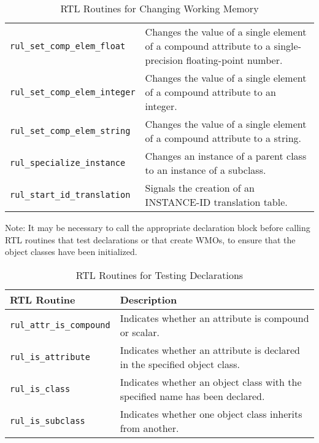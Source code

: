 \begin{table}[h]
\begin{tabularx}{\columnwidth}{lX}
    \verb|rul_set_comp_elem_float|   & Changes the value of a single element of a    
                                       compound attribute to a single-precision      
                                       floating-point number.                        \\
    \verb|rul_set_comp_elem_integer| & Changes the value of a single element of a    
                                       compound attribute to an integer.             \\
    \verb|rul_set_comp_elem_string|  & Changes the value of a single element of a    
                                       compound attribute to a string.               \\
    \verb|rul_specialize_instance|   & Changes an instance of a parent class to an   
                                       instance of a subclass.                       \\
    \verb|rul_start_id_translation|  & Signals the creation of an INSTANCE-ID        
                                       translation table.                            \\
    \bottomrule
  \end{tabularx}
  \caption{RTL Routines for Changing Working Memory}
  \label{t:6-6}
\end{table}

Note: It may be necessary to call the appropriate declaration block
before calling RTL routines that test declarations or that create
WMOs, to ensure that the object classes have been initialized.

\begin{table}[h]
  \begin{tabularx}{\columnwidth}{lX}
    \toprule
    RTL Routine & Description \\
    \midrule
    \verb|rul_attr_is_compound|  & Indicates whether an attribute is compound or
                                   scalar. \\
    \verb|rul_is_attribute| & Indicates whether an attribute is declared
                              in the
                              specified object class. \\
    \verb|rul_is_class| & Indicates whether an object class with the
                          specified name has been declared. \\
    \verb|rul_is_subclass| & Indicates whether one object class inherits
                             from another. \\
    \bottomrule
  \end{tabularx}  
  \caption{RTL Routines for Testing Declarations}
  \label{t:6-7}
\end{table}

